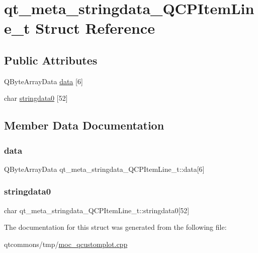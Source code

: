 \hypertarget{structqt__meta__stringdata___q_c_p_item_line__t}{}\section{qt\+\_\+meta\+\_\+stringdata\+\_\+\+Q\+C\+P\+Item\+Line\+\_\+t Struct Reference}
\label{structqt__meta__stringdata___q_c_p_item_line__t}
\subsection*{Public Attributes}
\begin{DoxyCompactItemize}
\item 
Q\+Byte\+Array\+Data \mbox{\hyperlink{structqt__meta__stringdata___q_c_p_item_line__t_a4caaf475c8c9a2899091e373fb1c6d49}{data}} \mbox{[}6\mbox{]}
\item 
char \mbox{\hyperlink{structqt__meta__stringdata___q_c_p_item_line__t_a35c5e2ac8b06d8035260983dc8b9dafa}{stringdata0}} \mbox{[}52\mbox{]}
\end{DoxyCompactItemize}


\subsection{Member Data Documentation}
\mbox{\label{structqt__meta__stringdata___q_c_p_item_line__t_a4caaf475c8c9a2899091e373fb1c6d49}} 
\subsubsection{\texorpdfstring{data}{data}}
{\footnotesize\ttfamily Q\+Byte\+Array\+Data qt\+\_\+meta\+\_\+stringdata\+\_\+\+Q\+C\+P\+Item\+Line\+\_\+t\+::data\mbox{[}6\mbox{]}}

\mbox{\label{structqt__meta__stringdata___q_c_p_item_line__t_a35c5e2ac8b06d8035260983dc8b9dafa}} 
\subsubsection{\texorpdfstring{stringdata0}{stringdata0}}
{\footnotesize\ttfamily char qt\+\_\+meta\+\_\+stringdata\+\_\+\+Q\+C\+P\+Item\+Line\+\_\+t\+::stringdata0\mbox{[}52\mbox{]}}



The documentation for this struct was generated from the following file\+:\begin{DoxyCompactItemize}
\item 
qtcommons/tmp/\mbox{\hyperlink{moc__qcustomplot_8cpp}{moc\+\_\+qcustomplot.\+cpp}}\end{DoxyCompactItemize}

